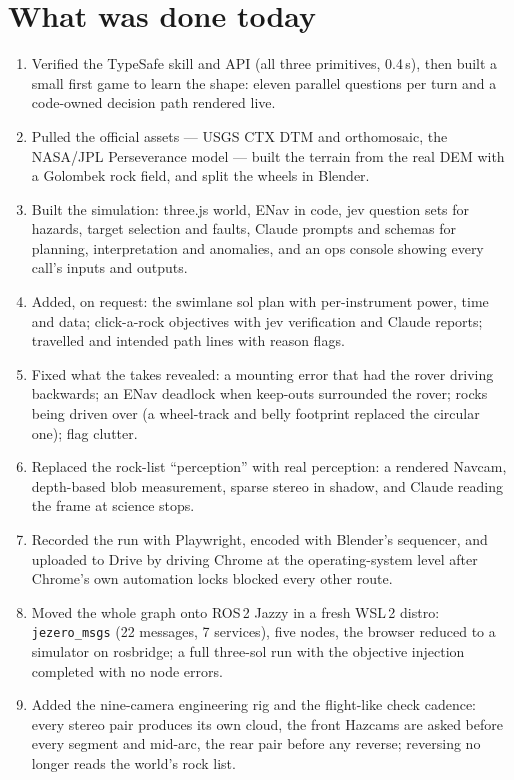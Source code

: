 \documentclass[11pt]{article}
\begin{document}
\section{What was done today}
\begin{enumerate}
\item Verified the TypeSafe skill and API (all three primitives, 0.4\,s), then built a small first game to learn the shape: eleven parallel questions per turn and a code-owned decision path rendered live.
\item Pulled the official assets --- USGS CTX DTM and orthomosaic, the NASA/JPL Perseverance model --- built the terrain from the real DEM with a Golombek rock field, and split the wheels in Blender.
\item Built the simulation: three.js world, ENav in code, jev question sets for hazards, target selection and faults, Claude prompts and schemas for planning, interpretation and anomalies, and an ops console showing every call's inputs and outputs.
\item Added, on request: the swimlane sol plan with per-instrument power, time and data; click-a-rock objectives with jev verification and Claude reports; travelled and intended path lines with reason flags.
\item Fixed what the takes revealed: a mounting error that had the rover driving backwards; an ENav deadlock when keep-outs surrounded the rover; rocks being driven over (a wheel-track and belly footprint replaced the circular one); flag clutter.
\item Replaced the rock-list ``perception'' with real perception: a rendered Navcam, depth-based blob measurement, sparse stereo in shadow, and Claude reading the frame at science stops.
\item Recorded the run with Playwright, encoded with Blender's sequencer, and uploaded to Drive by driving Chrome at the operating-system level after Chrome's own automation locks blocked every other route.
\item Moved the whole graph onto ROS\,2 Jazzy in a fresh WSL\,2 distro: \texttt{jezero\_msgs} (22 messages, 7 services), five nodes, the browser reduced to a simulator on rosbridge; a full three-sol run with the objective injection completed with no node errors.
\item Added the nine-camera engineering rig and the flight-like check cadence: every stereo pair produces its own cloud, the front Hazcams are asked before every segment and mid-arc, the rear pair before any reverse; reversing no longer reads the world's rock list.

\end{enumerate}
\end{document}
